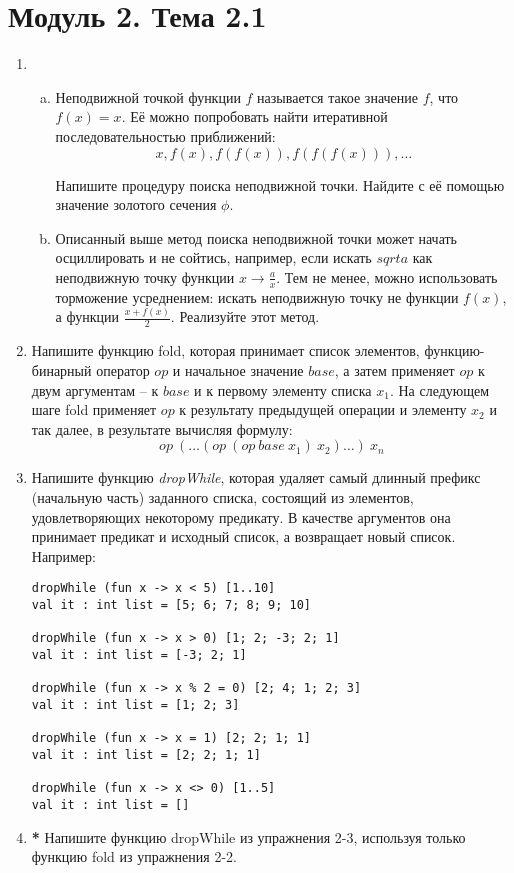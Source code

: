 \documentclass[a4paper,11pt]{article}
\begin{document}
\section*{Модуль 2. Тема 2.1}
\begin{enumerate}[{2-}1]
\item \begin{enumerate}[(a)]
\item Неподвижной точкой функции $f$ называется такое значение $f$, что 
$f(x) = x$. Её можно попробовать найти итеративной последовательностью
приближений:
\begin{equation*}
  x, f(x), f(f(x)), f(f(f(x))), \ldots
\end{equation*}

Напишите процедуру поиска неподвижной точки. Найдите с её помощью значение
золотого сечения $\phi$.

\item Описанный выше метод поиска неподвижной точки может начать осциллировать
и не сойтись, например, если искать $sqrt{a}$ как неподвижную точку функции
$x \rightarrow \frac{a}{x}$. Тем не менее, можно использовать торможение
усреднением: искать неподвижную точку не функции $f(x)$, а функции
$\frac{x+f(x)}{2}$. Реализуйте этот метод.
\end{enumerate}

\item Напишите функцию fold, которая принимает список элементов, 
функцию-бинарный оператор $op$ и начальное значение $base$, а затем применяет
$op$ к двум аргументам -- к $base$ и к первому элементу списка $x_1$. На
следующем шаге fold применяет $op$ к результату предыдущей операции и элементу
$x_2$ и так далее, в результате вычисляя формулу:
\begin{equation*}
  op~(\ldots (op~(op~base~x_1)~x_2) \ldots)~x_n
\end{equation*}

\item Напишите функцию \emph{dropWhile}, которая удаляет самый длинный префикс
(начальную часть) заданного списка, состоящий из элементов, удовлетворяющих
некоторому предикату. В качестве аргументов она принимает предикат и исходный
список, а возвращает новый список. Например:

\begin{lstlisting}
dropWhile (fun x -> x < 5) [1..10]
val it : int list = [5; 6; 7; 8; 9; 10]

dropWhile (fun x -> x > 0) [1; 2; -3; 2; 1]
val it : int list = [-3; 2; 1]

dropWhile (fun x -> x % 2 = 0) [2; 4; 1; 2; 3]
val it : int list = [1; 2; 3]

dropWhile (fun x -> x = 1) [2; 2; 1; 1]
val it : int list = [2; 2; 1; 1]

dropWhile (fun x -> x <> 0) [1..5]
val it : int list = []
\end{lstlisting}

\item \textbf{*} Напишите функцию dropWhile из упражнения 2-3, используя только
функцию fold из упражнения 2-2.
\end{enumerate}
\end{document}
